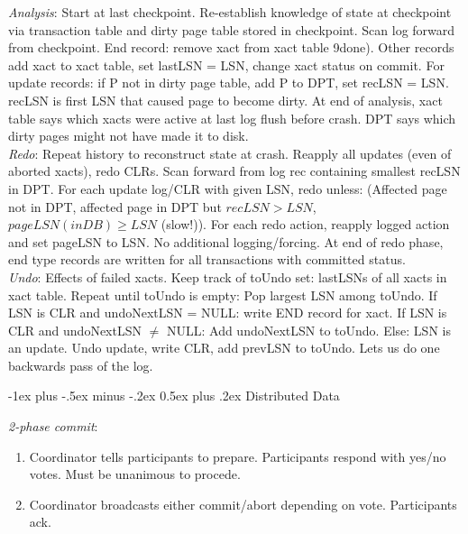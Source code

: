 \documentclass[10pt,landscape]{article}
\makeatletter
\renewcommand{\section}{\@startsection{section}{1}{0mm}%
                                {-1ex plus -.5ex minus -.2ex}%
                                {0.5ex plus .2ex}%
                                {\normalfont\large\bfseries}}
\makeatother
\begin{document}
\begin{multicols}{3}
\textit{Analysis}: Start at last checkpoint. Re-establish knowledge of state at checkpoint via transaction table and dirty page table stored in checkpoint. Scan log forward from checkpoint. End record: remove xact from xact table 9done). Other records add xact to xact table, set lastLSN = LSN, change xact status on commit. For update records: if P not in dirty page table, add P to DPT, set recLSN = LSN. recLSN is first LSN that caused page to become dirty. At end of analysis, xact table says which xacts were active at last log flush before crash. DPT says which dirty pages might not have made it to disk. \\
\textit{Redo}: Repeat history to reconstruct state at crash. Reapply all updates (even of aborted xacts), redo CLRs. Scan forward from log rec containing smallest recLSN in DPT. For each update log/CLR with given LSN, redo unless: (Affected page not in DPT, affected page in DPT but $recLSN > LSN$, $pageLSN(inDB) \ge LSN$ (slow!)). For each redo action, reapply logged action and set pageLSN to LSN. No additional logging/forcing. At end of redo phase, end type records are written for all transactions with committed status. \\
\textit{Undo}: Effects of failed xacts. Keep track of toUndo set: lastLSNs of all xacts in xact table. Repeat until toUndo is empty: Pop largest LSN among toUndo. If LSN is CLR and undoNextLSN = NULL: write END record for xact. If LSN is CLR and undoNextLSN $\ne$ NULL: Add undoNextLSN to toUndo. Else: LSN is an update. Undo update, write CLR, add prevLSN to toUndo. Lets us do one backwards pass of the log.


\section{Distributed Data}

\textit{2-phase commit}:

\begin{enumerate}
  \item Coordinator tells participants to prepare. Participants respond with yes/no votes. Must be unanimous to procede.
  \item Coordinator broadcasts either commit/abort depending on vote. Participants ack.
\end{enumerate}





\end{multicols}
\end{document}
